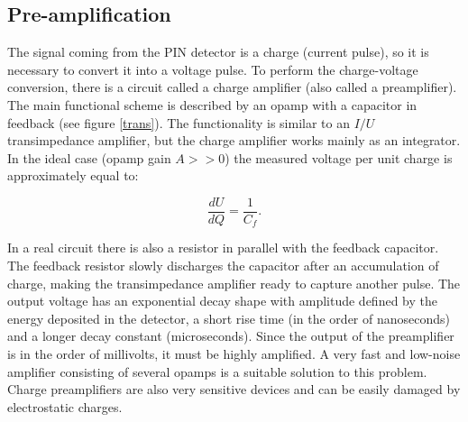 \subsection{Pre-amplification}
The signal coming from the PIN detector is a charge (current pulse), so it is necessary to convert it into a voltage pulse. To perform the charge-voltage conversion, there is a circuit called a charge amplifier (also called a preamplifier). The main functional scheme is described by an opamp with a capacitor in feedback (see figure \ref{trans}). The functionality is similar to an $I/U$ transimpedance amplifier, but the charge amplifier works mainly as an integrator. In the ideal case (opamp gain $A >> 0$) the measured voltage per unit charge is approximately equal to:

\begin{equation}
\frac{dU}{dQ} = \frac{1}{C_{f}}.
\end{equation}
\par
In a real circuit there is also a resistor in parallel with the feedback capacitor. The feedback resistor slowly discharges the capacitor after an accumulation of charge, making the transimpedance amplifier ready to capture another pulse. The output voltage has an exponential decay shape with amplitude defined by the energy deposited in the detector, a short rise time (in the order of nanoseconds) and a longer decay constant (microseconds). Since the output of the preamplifier is in the order of millivolts, it must be highly amplified. A very fast and low-noise amplifier consisting of several opamps is a suitable solution to this problem. Charge preamplifiers are also very sensitive devices and can be easily damaged by electrostatic charges. 

